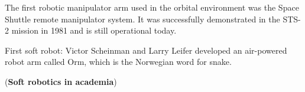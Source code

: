 
The first robotic manipulator arm used in the orbital environment was the Space Shuttle remote manipulator system. It was successfully demonstrated in the STS-2 mission in 1981 and is still operational today.

First soft robot: Victor Scheinman and Larry Leifer developed an air-powered robot arm called Orm, which is the Norwegian word for snake.



(\textbf{Soft robotics in academia})
